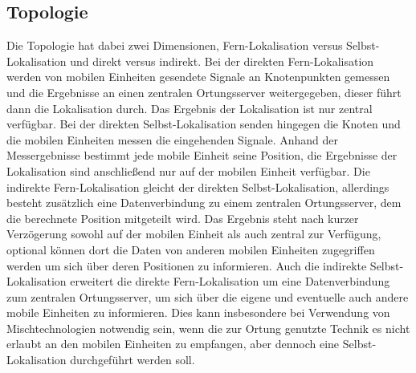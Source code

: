 \subsection{Topologie}
Die Topologie hat dabei zwei Dimensionen, Fern-Lokalisation versus Selbst-Lokalisation und direkt versus indirekt. 
Bei der direkten Fern-Lokalisation werden von mobilen Einheiten gesendete Signale an Knotenpunkten gemessen und die Ergebnisse an einen zentralen Ortungsserver weitergegeben, dieser führt dann die Lokalisation durch. Das Ergebnis der Lokalisation ist nur zentral verfügbar.
Bei der direkten Selbst-Lokalisation senden hingegen die Knoten und die mobilen Einheiten messen die eingehenden Signale. Anhand der Messergebnisse bestimmt jede mobile Einheit seine Position, die Ergebnisse der Lokalisation sind anschließend nur auf der mobilen Einheit verfügbar.
Die indirekte Fern-Lokalisation gleicht der direkten Selbst-Lokalisation, allerdings besteht zusätzlich eine Datenverbindung zu einem zentralen Ortungsserver, dem die berechnete Position mitgeteilt wird. Das Ergebnis steht nach kurzer Verzögerung sowohl auf der mobilen Einheit als auch zentral zur Verfügung, optional können dort die Daten von anderen mobilen Einheiten zugegriffen werden um sich über deren Positionen zu informieren.
Auch die indirekte Selbst-Lokalisation erweitert die direkte Fern-Lokalisation um eine Datenverbindung zum zentralen Ortungsserver, um sich über die eigene und eventuelle auch andere mobile Einheiten zu informieren. Dies kann insbesondere bei Verwendung von Mischtechnologien notwendig sein, wenn die zur Ortung genutzte Technik es nicht erlaubt an den mobilen Einheiten zu empfangen, aber dennoch eine Selbst-Lokalisation durchgeführt werden soll.

